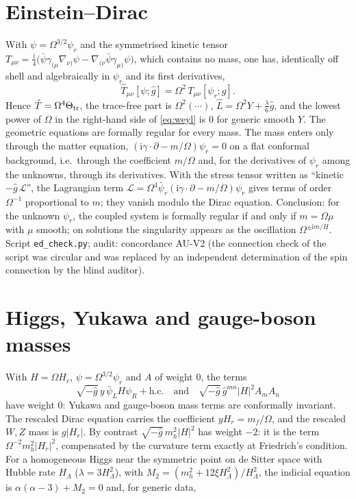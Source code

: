 \documentclass[11pt,a4paper]{article}
\newcommand{\ii}{\mathrm{i}}
\begin{document}
\section{Einstein--Dirac}
\label{sec:ed}
With $\psi=\Omega^{3/2}\psi_{r}$ and the symmetrised kinetic tensor $T_{\mu\nu}=\tfrac{\ii}{4}\big(\bar\psi\gamma_{(\mu}\nabla_{\nu)}\psi-\nabla_{(\nu}\bar\psi\gamma_{\mu)}\psi\big)$, which contains no mass, one has, identically off shell and algebraically in $\psi_{r}$ and its first derivatives,
\begin{equation}
\hat T_{\mu\nu}[\psi;\hat g]=\Omega^{2}\,T_{\mu\nu}[\psi_{r};g].
\end{equation}
Hence $\hat T=\Omega^{4}\Theta_{\rm tr}$, the trace-free part is $\Omega^{2}(\cdots)$, $\hat L=\Omega^{2}Y+\tfrac{\lambda}{6}\hat g$, and the lowest power of $\Omega$ in the right-hand side of \eqref{eq:weyl} is $0$ for generic smooth $Y$. The geometric equations are formally regular for every mass. The mass enters only through the matter equation, $(\ii\gamma\cdot\partial-m/\Omega)\psi_{r}=0$ on a flat conformal background, i.e.\ through the coefficient $m/\Omega$ and, for the derivatives of $\psi_{r}$ among the unknowns, through its derivatives. With the stress tensor written as ``kinetic $-\hat g\,\mathcal{L}$'', the Lagrangian term $\mathcal{L}=\Omega^{4}\bar\psi_{r}(\ii\gamma\cdot\partial-m/\Omega)\psi_{r}$ gives terms of order $\Omega^{-1}$ proportional to $m$; they vanish modulo the Dirac equation. Conclusion: for the unknown $\psi_{r}$, the coupled system is formally regular if and only if $m=\Omega\mu$ with $\mu$ smooth; on solutions the singularity appears as the oscillation $\Omega^{\pm\ii m/H}$. Script \texttt{ed\_check.py}; audit: concordance AU-V2 (the connection check of the script was circular and was replaced by an independent determination of the spin connection by the blind auditor).

\section{Higgs, Yukawa and gauge-boson masses}
\label{sec:hx}
With $H=\Omega H_{r}$, $\psi=\Omega^{3/2}\psi_{r}$ and $A$ of weight $0$, the terms
\[\sqrt{-\hat g}\,y\,\bar\psi_{L}H\psi_{R}+\text{h.c.}\quad\text{and}\quad\sqrt{-\hat g}\,\hat g^{mn}|H|^{2}A_{m}A_{n}\]
have weight $0$: Yukawa and gauge-boson mass terms are conformally invariant. The rescaled Dirac equation carries the coefficient $y H_{r}=m_{f}/\Omega$, and the rescaled $W,Z$ mass is $g|H_{r}|$. By contrast $\sqrt{-\hat g}\,m_{h}^{2}|H|^{2}$ has weight $-2$: it is the term $\Omega^{-2}m_{h}^{2}|H_{r}|^{2}$, compensated by the curvature term exactly at Friedrich's condition. For a homogeneous Higgs near the symmetric point on de Sitter space with Hubble rate $H_{\Lambda}$ ($\lambda=3H_{\Lambda}^{2}$), with $M_{2}=(m_{h}^{2}+12\xi H_{\Lambda}^{2})/H_{\Lambda}^{2}$, the indicial equation is $\alpha(\alpha-3)+M_{2}=0$ and, for generic data,
\end{document}
